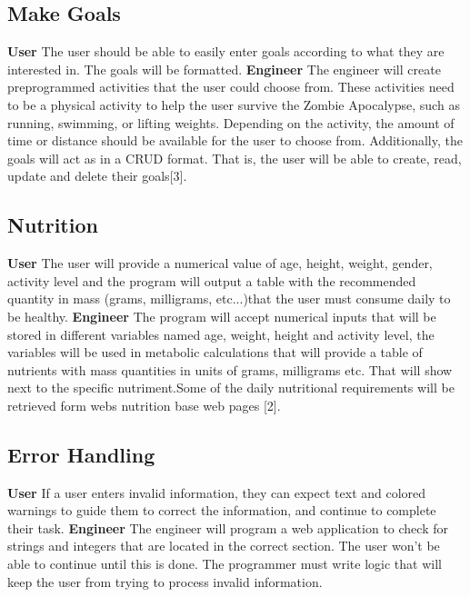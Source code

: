 \documentclass[a4paper]{article}
\begin{document}
\subsection{Make Goals}
\textbf{User} The user should be able to easily enter goals according to what they are interested in. The goals will be formatted.
\newline
\newline
\textbf{Engineer} The engineer will create preprogrammed activities that the user could choose from. These activities need to be a physical activity to help the user survive the Zombie Apocalypse, such as running, swimming, or lifting weights. Depending on the activity, the amount of time or distance should be available for the user to choose from. Additionally, the goals will act as in a CRUD format. That is, the user will be able to create, read, update and delete their goals[3]. 

\subsection{Nutrition}
\textbf{User} The user will provide a numerical value of age, height, weight, gender, activity level and the program will output a table with the recommended quantity in mass (grams, milligrams, etc...)that the user must consume daily to be healthy.
\newline
\newline
\textbf{Engineer} The program will accept numerical inputs that will be stored in different variables named age, weight, height and activity level, the variables will be used in metabolic calculations that will provide a table of nutrients with mass quantities in units of grams, milligrams etc. That will show next to the specific nutriment.Some of the daily nutritional requirements will be retrieved form webs nutrition base web pages [2].

\subsection{Error Handling}
\textbf{User} If a user enters invalid information, they can expect text and colored warnings to guide them to correct the information, and continue to complete their task.
\newline
\newline
\textbf{Engineer} The engineer will program a web application to check for strings and integers that are located in the correct section. The user won't be able to continue until this is done. The programmer must write logic that will keep the user from trying to process invalid information.
\end{document}
